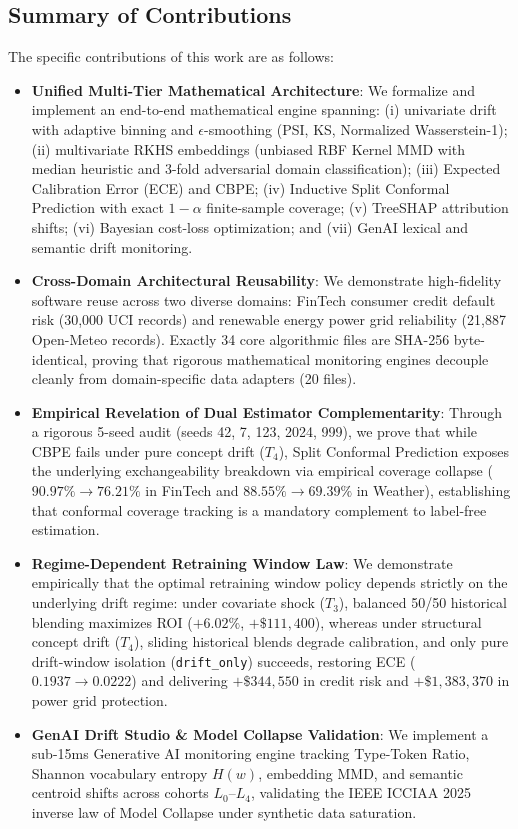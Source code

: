 \documentclass[conference]{IEEEtran}
\begin{document}
\subsection{Summary of Contributions}
The specific contributions of this work are as follows:
\begin{itemize}
    \item \textbf{Unified Multi-Tier Mathematical Architecture}: We formalize and implement an end-to-end mathematical engine spanning: (i) univariate drift with adaptive binning and $\epsilon$-smoothing (PSI, KS, Normalized Wasserstein-1); (ii) multivariate RKHS embeddings (unbiased RBF Kernel MMD with median heuristic and 3-fold adversarial domain classification); (iii) Expected Calibration Error (ECE) and CBPE; (iv) Inductive Split Conformal Prediction with exact $1-\alpha$ finite-sample coverage; (v) TreeSHAP attribution shifts; (vi) Bayesian cost-loss optimization; and (vii) GenAI lexical and semantic drift monitoring.
    \item \textbf{Cross-Domain Architectural Reusability}: We demonstrate high-fidelity software reuse across two diverse domains: FinTech consumer credit default risk (30,000 UCI records) and renewable energy power grid reliability (21,887 Open-Meteo records). Exactly 34 core algorithmic files are SHA-256 byte-identical, proving that rigorous mathematical monitoring engines decouple cleanly from domain-specific data adapters (20 files).
    \item \textbf{Empirical Revelation of Dual Estimator Complementarity}: Through a rigorous 5-seed audit (seeds 42, 7, 123, 2024, 999), we prove that while CBPE fails under pure concept drift ($T_4$), Split Conformal Prediction exposes the underlying exchangeability breakdown via empirical coverage collapse ($90.97\% \to 76.21\%$ in FinTech and $88.55\% \to 69.39\%$ in Weather), establishing that conformal coverage tracking is a mandatory complement to label-free estimation.
    \item \textbf{Regime-Dependent Retraining Window Law}: We demonstrate empirically that the optimal retraining window policy depends strictly on the underlying drift regime: under covariate shock ($T_3$), balanced 50/50 historical blending maximizes ROI ($+6.02\%$, $+\$111,400$), whereas under structural concept drift ($T_4$), sliding historical blends degrade calibration, and only pure drift-window isolation (\texttt{drift\_only}) succeeds, restoring ECE ($0.1937 \to 0.0222$) and delivering $+\$344,550$ in credit risk and $+\$1,383,370$ in power grid protection.
    \item \textbf{GenAI Drift Studio \& Model Collapse Validation}: We implement a sub-15ms Generative AI monitoring engine tracking Type-Token Ratio, Shannon vocabulary entropy $H(w)$, embedding MMD, and semantic centroid shifts across cohorts $L_0$--$L_4$, validating the IEEE ICCIAA 2025 inverse law of Model Collapse under synthetic data saturation.
\end{itemize}
\end{document}

